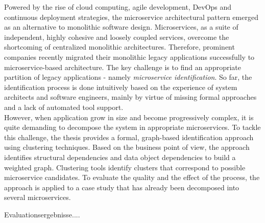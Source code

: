 

\Abstract
Powered by the rise of cloud computing, agile development, DevOps and continuous deployment strategies, the microservice architectural pattern emerged as an alternative to monolithic software design. Microservices, as a suite of independent, highly cohesive and loosely coupled services, overcome the shortcoming of centralized monolithic architectures. Therefore, prominent companies recently migrated their monolithic legacy applications successfully to microservice-based architecture. The key challenge is to find an appropriate partition of legacy applications - namely \textit{microservice identification}. So far, the identification process is done intuitively based on the experience of system architects and software engineers, mainly by virtue of missing formal approaches and a lack of automated tool support. \\
However, when application grow in size and become progressively complex, it is quite demanding to decompose the system in appropriate microservices.
To tackle this challenge, the thesis provides a formal, graph-based identification approach using clustering techniques. Based on the business point of view, the approach identifies structural dependencies and data object dependencies to build a weighted graph. Clustering tools identify clusters that correspond to possible microservice candidates. To evaluate the quality and the effect of the process, the approach is applied to a case study that has already been decomposed into several microservices. 

Evaluationsergebnisse....


